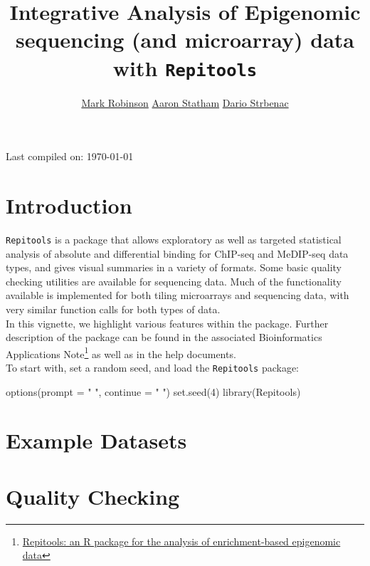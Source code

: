 \documentclass[a4paper, 12pt]{article}
\author{\href{mailto:m.robinson@garvan.org.au}{Mark Robinson}  \href{mailto:a.statham@garvan.org.au}{Aaron Statham}  \href{mailto:d.strbenac@garvan.org.au}{Dario Strbenac}}
\begin{document}

\title{Integrative Analysis of Epigenomic sequencing (and microarray) data with \texttt{Repitools}}
\date{}
\maketitle
\begin{center}
    Last compiled on: \today
\end{center}

\section{Introduction}
\texttt{Repitools} is a package that allows exploratory as well as targeted statistical analysis of absolute and differential binding for ChIP-seq and MeDIP-seq data types, and gives visual summaries in a variety of formats. Some basic quality checking utilities are available for sequencing data. Much of the functionality available is implemented for both tiling microarrays and sequencing data, with very similar function calls for both types of data. \\

In this vignette, we highlight various features within the package.  Further description of the package can be found in the associated Bioinformatics Applications Note\footnote{\href{http://bioinformatics.oxfordjournals.org/content/26/13/1662.abstract}{Repitools: an R package for the analysis of enrichment-based epigenomic data}} as well as in the help documents. \\

To start with, set a random seed, and load the \texttt{Repitools} package:

\begin{Schunk}
\begin{Sinput}
 options(prompt = " ", continue = " ")
 set.seed(4)
 library(Repitools)
\end{Sinput}
\end{Schunk}

\section{Example Datasets}


\section{Quality Checking}

\end{document}
